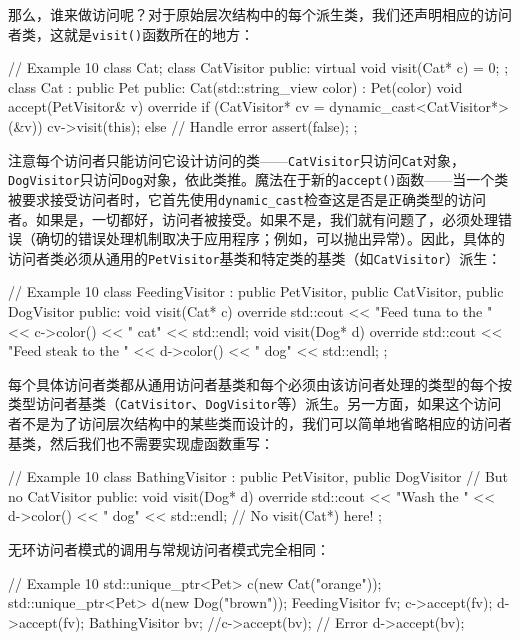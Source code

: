 \begin{code}
{那么，谁来做访问呢？对于原始层次结构中的每个派生类，我们还声明相应的访问者类，这就是\texttt{visit()}函数所在的地方：

\begin{code}
// Example 10
class Cat;
class CatVisitor {
  public:
  virtual void visit(Cat* c) = 0;
};
class Cat : public Pet {
  public:
  Cat(std::string_view color) : Pet(color) {}
  void accept(PetVisitor& v) override {
    if (CatVisitor* cv = dynamic_cast<CatVisitor*>(&v)) {
      cv->visit(this);
    } else { // Handle error
      assert(false);
    }
  }
};
\end{code}

注意每个访问者只能访问它设计访问的类——\texttt{CatVisitor}只访问\texttt{Cat}对象，\texttt{DogVisitor}只访问\texttt{Dog}对象，依此类推。魔法在于新的\texttt{accept()}函数——当一个类被要求接受访问者时，它首先使用\texttt{dynamic\_cast}检查这是否是正确类型的访问者。如果是，一切都好，访问者被接受。如果不是，我们就有问题了，必须处理错误（确切的错误处理机制取决于应用程序；例如，可以抛出异常）。因此，具体的访问者类必须从通用的\texttt{PetVisitor}基类和特定类的基类（如\texttt{CatVisitor}）派生：

\begin{code}
// Example 10
class FeedingVisitor : public PetVisitor,
                       public CatVisitor,
                       public DogVisitor {
  public:
  void visit(Cat* c) override {
    std::cout << "Feed tuna to the " << c->color()
              << " cat" << std::endl;
  }
  void visit(Dog* d) override {
    std::cout << "Feed steak to the " << d->color()
              << " dog" << std::endl;
  }
};
\end{code}

每个具体访问者类都从通用访问者基类和每个必须由该访问者处理的类型的每个按类型访问者基类（\texttt{CatVisitor}、\texttt{DogVisitor}等）派生。另一方面，如果这个访问者不是为了访问层次结构中的某些类而设计的，我们可以简单地省略相应的访问者基类，然后我们也不需要实现虚函数重写：

\begin{code}
// Example 10
class BathingVisitor : public PetVisitor,
                       public DogVisitor
                       { // But no CatVisitor
  public:
  void visit(Dog* d) override {
    std::cout << "Wash the " << d->color()
              << " dog" << std::endl;
  }
  // No visit(Cat*) here!
};
\end{code}

无环访问者模式的调用与常规访问者模式完全相同：

\begin{code}
// Example 10
std::unique_ptr<Pet> c(new Cat("orange"));
std::unique_ptr<Pet> d(new Dog("brown"));
FeedingVisitor fv;
c->accept(fv);
d->accept(fv);
BathingVisitor bv;
//c->accept(bv); // Error
d->accept(bv);
\end{code}

}
\end{code}
